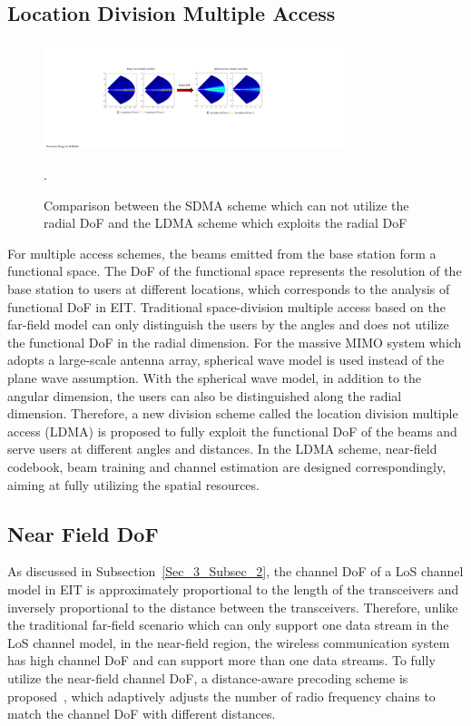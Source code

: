 \documentclass[journal,twocolumn]{IEEEtran}
\begin{document}
\subsection{Location Division Multiple Access}
\begin{figure}
	\centering 
	\includegraphics[width=0.8\textwidth]{figures/LDMA.pdf} 
	\caption{Comparison between the SDMA scheme which can not utilize the radial DoF and the LDMA scheme which exploits the radial DoF~\cite{wu2022multiple} }. 
	\label{fig:LDMA}
\end{figure}
For multiple access schemes, the beams emitted from the base station form a functional space. The DoF of the functional space represents the resolution of the base station to users at different locations, which corresponds to the analysis of functional DoF in EIT. 
Traditional space-division multiple access based on the far-field model can only distinguish the users by the angles and does not utilize the functional DoF in the radial dimension. 
For the massive MIMO system which adopts a large-scale antenna array, spherical wave model is used instead of the plane wave assumption. 
With the spherical wave model, in addition to the angular dimension, the users can also be distinguished along the radial dimension. 
Therefore, a new division scheme called the location division multiple access (LDMA) is proposed to fully exploit the functional DoF of the beams and serve users at different angles and distances. 
In the LDMA scheme, near-field codebook, beam training and channel estimation are designed correspondingly, aiming at fully utilizing the spatial resources. 

\subsection{Near Field DoF}
As discussed in Subsection~\ref{Sec_3_Subsec_2}, the channel DoF of a LoS channel model in EIT is approximately proportional to the length of the transceivers and inversely proportional to the distance between the transceivers. Therefore, unlike the traditional far-field scenario which can only support one data stream in the LoS channel model, in the near-field region, the wireless communication system has high channel DoF and can support more than one data streams. To fully utilize the near-field channel DoF, a distance-aware precoding scheme is proposed~\cite{wu2022multiple}, which adaptively adjusts the number of radio frequency chains to match the channel DoF with different distances.   
\end{document}
